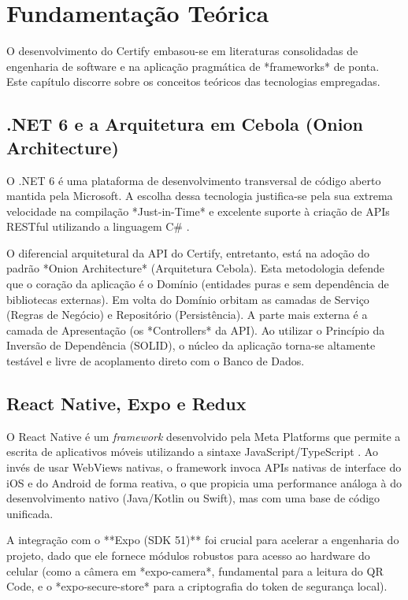 \chapter{Fundamentação Teórica}

O desenvolvimento do Certify embasou-se em literaturas consolidadas de engenharia de software e na aplicação pragmática de *frameworks* de ponta. Este capítulo discorre sobre os conceitos teóricos das tecnologias empregadas.

\section{.NET 6 e a Arquitetura em Cebola (Onion Architecture)}

O .NET 6 é uma plataforma de desenvolvimento transversal de código aberto mantida pela Microsoft. A escolha dessa tecnologia justifica-se pela sua extrema velocidade na compilação *Just-in-Time* e excelente suporte à criação de APIs RESTful utilizando a linguagem C\# \cite{dotnet}.

O diferencial arquitetural da API do Certify, entretanto, está na adoção do padrão *Onion Architecture* (Arquitetura Cebola). Esta metodologia defende que o coração da aplicação é o Domínio (entidades puras e sem dependência de bibliotecas externas). Em volta do Domínio orbitam as camadas de Serviço (Regras de Negócio) e Repositório (Persistência). A parte mais externa é a camada de Apresentação (os *Controllers* da API). Ao utilizar o Princípio da Inversão de Dependência (SOLID), o núcleo da aplicação torna-se altamente testável e livre de acoplamento direto com o Banco de Dados.

\section{React Native, Expo e Redux}

O React Native é um \textit{framework} desenvolvido pela Meta Platforms que permite a escrita de aplicativos móveis utilizando a sintaxe JavaScript/TypeScript \cite{reactnative}. Ao invés de usar WebViews nativas, o framework invoca APIs nativas de interface do iOS e do Android de forma reativa, o que propicia uma performance análoga à do desenvolvimento nativo (Java/Kotlin ou Swift), mas com uma base de código unificada.

A integração com o **Expo (SDK 51)** \cite{expo} foi crucial para acelerar a engenharia do projeto, dado que ele fornece módulos robustos para acesso ao hardware do celular (como a câmera em *expo-camera*, fundamental para a leitura do QR Code, e o *expo-secure-store* para a criptografia do token de segurança local). 

